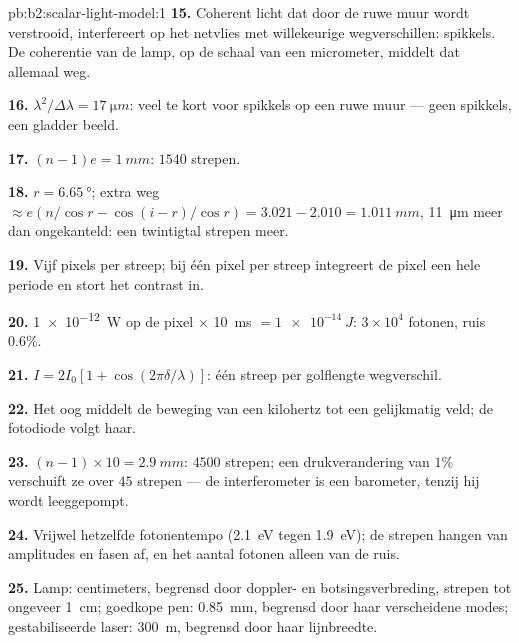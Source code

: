 \begin{solution}{pb:b2:scalar-light-model:1}
\textbf{15.} Coherent licht dat door de ruwe muur wordt verstrooid,
interfereert op het netvlies met willekeurige wegverschillen: spikkels. De
coherentie van de lamp, op de schaal van een micrometer, middelt dat
allemaal weg.

\textbf{16.} $\lambda^2/\Delta\lambda = \qty{17}{\micro m}$: veel te kort
voor spikkels op een ruwe muur --- geen spikkels, een gladder beeld.

\textbf{17.} $(n - 1)e = \qty{1}{mm}$: $1540$ strepen.

\textbf{18.} $r = \qty{6.65}{\degree}$; extra weg
$\approx e(n/\cos r - \cos(i - r)/\cos r)
= 3.021 - 2.010 = \qty{1.011}{mm}$,
\qty{11}{\micro m} meer dan ongekanteld: een twintigtal strepen meer.

\textbf{19.} Vijf pixels per streep; bij één pixel per streep integreert de
pixel een hele periode en stort het contrast in.

\textbf{20.} \qty{1e-12}{W} op de pixel $\times$ \qty{10}{ms}
$= \qty{1e-14}{J}$: $3 \times 10^4$ fotonen, ruis $0.6\%$.

\textbf{21.} $I = 2I_0[1 + \cos(2\pi\delta/\lambda)]$: één streep per
golflengte wegverschil.

\textbf{22.} Het oog middelt de beweging van een kilohertz tot een
gelijkmatig veld; de fotodiode volgt haar.

\textbf{23.} $(n - 1) \times 10 = \qty{2.9}{mm}$: $4500$ strepen; een
drukverandering van $1\%$ verschuift ze over $45$ strepen --- de
interferometer is een barometer, tenzij hij wordt leeggepompt.

\textbf{24.} Vrijwel hetzelfde fotonentempo (\qty{2.1}{eV} tegen
\qty{1.9}{eV}); de strepen hangen van amplitudes en fasen af, en het aantal
fotonen alleen van de ruis.

\textbf{25.} Lamp: centimeters, begrensd door doppler- en
botsingsverbreding, strepen tot ongeveer \qty{1}{cm}; goedkope pen:
\qty{0.85}{mm}, begrensd door haar verscheidene modes; gestabiliseerde
laser: \qty{300}{m}, begrensd door haar lijnbreedte.
\end{solution}
